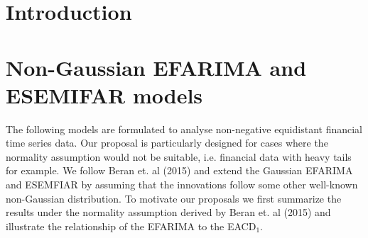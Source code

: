 \documentclass[12pt]{article}
\begin{document}
\section{Introduction}

%
%	
\section{Non-Gaussian EFARIMA and ESEMIFAR models}
The following models are formulated to analyse non-negative equidistant financial time series data. Our proposal is particularly designed for cases where the normality assumption would not be suitable, i.e. financial data with heavy tails for example. We follow Beran et. al (2015) and extend the Gaussian EFARIMA and ESEMFIAR by assuming that the innovations follow some other well-known non-Gaussian distribution. To motivate our proposals we first summarize the results under the normality assumption derived by Beran et. al (2015) and illustrate the relationship of the EFARIMA to the EACD$_1$.
\end{document}
